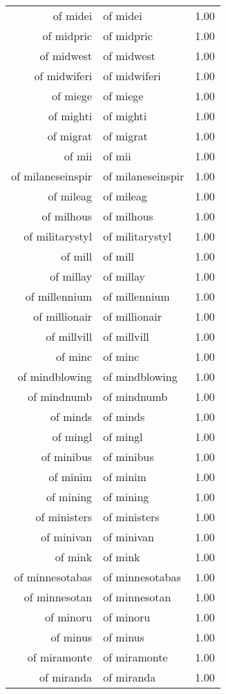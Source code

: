 \begin{table}[ht]
\begin{tabular}{rlr}
  of midei & of midei & 1.00 \\ 
  of midpric & of midpric & 1.00 \\ 
  of midwest & of midwest & 1.00 \\ 
  of midwiferi & of midwiferi & 1.00 \\ 
  of miege & of miege & 1.00 \\ 
  of mighti & of mighti & 1.00 \\ 
  of migrat & of migrat & 1.00 \\ 
  of mii & of mii & 1.00 \\ 
  of milaneseinspir & of milaneseinspir & 1.00 \\ 
  of mileag & of mileag & 1.00 \\ 
  of milhous & of milhous & 1.00 \\ 
  of militarystyl & of militarystyl & 1.00 \\ 
  of mill & of mill & 1.00 \\ 
  of millay & of millay & 1.00 \\ 
  of millennium & of millennium & 1.00 \\ 
  of millionair & of millionair & 1.00 \\ 
  of millvill & of millvill & 1.00 \\ 
  of minc & of minc & 1.00 \\ 
  of mindblowing & of mindblowing & 1.00 \\ 
  of mindnumb & of mindnumb & 1.00 \\ 
  of minds & of minds & 1.00 \\ 
  of mingl & of mingl & 1.00 \\ 
  of minibus & of minibus & 1.00 \\ 
  of minim & of minim & 1.00 \\ 
  of mining & of mining & 1.00 \\ 
  of ministers & of ministers & 1.00 \\ 
  of minivan & of minivan & 1.00 \\ 
  of mink & of mink & 1.00 \\ 
  of minnesotabas & of minnesotabas & 1.00 \\ 
  of minnesotan & of minnesotan & 1.00 \\ 
  of minoru & of minoru & 1.00 \\ 
  of minus & of minus & 1.00 \\ 
  of miramonte & of miramonte & 1.00 \\ 
  of miranda & of miranda & 1.00 \\ 

\end{tabular}
\end{table}
